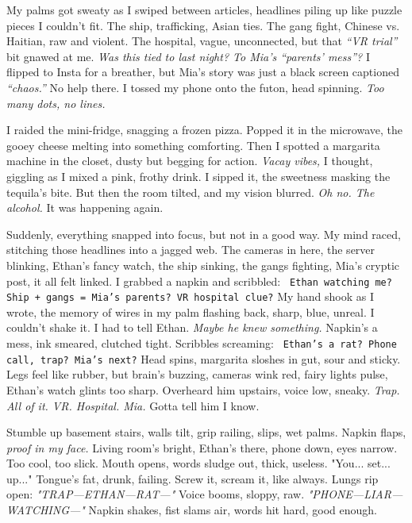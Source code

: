\documentclass[12pt]{article}
\newcommand{\note}[1]{\texttt{\small \color{DarkGray} #1}}
\begin{document}
My palms got sweaty as I swiped between articles, headlines piling up like puzzle pieces I couldn’t fit. The ship, trafficking, Asian ties. The gang fight, Chinese vs. Haitian, raw and violent. The hospital, vague, unconnected, but that \textit{“VR trial”} bit gnawed at me. \textit{Was this tied to last night? To \textnormal{Mia}’s “parents’ mess”?} I flipped to Insta for a breather, but \textnormal{Mia}’s story was just a black screen captioned \textit{“chaos.”} No help there. I tossed my phone onto the futon, head spinning. \textit{Too many dots, no lines.}

I raided the mini-fridge, snagging a frozen pizza. Popped it in the microwave, the gooey cheese melting into something comforting. Then I spotted a margarita machine in the closet, dusty but begging for action. \textit{Vacay vibes,} I thought, giggling as I mixed a pink, frothy drink. I sipped it, the sweetness masking the tequila’s bite. But then the room tilted, and my vision blurred. \textit{Oh no. The alcohol.} It was happening again.

Suddenly, everything snapped into focus, but not in a good way. My mind raced, stitching those headlines into a jagged web. The cameras in here, the server blinking, \textnormal{Ethan}’s fancy watch, the ship sinking, the gangs fighting, \textnormal{Mia}’s cryptic post, it all felt linked. I grabbed a napkin and scribbled: \note{Ethan watching me? Ship + gangs = Mia’s parents? VR hospital clue?} My hand shook as I wrote, the memory of wires in my palm flashing back, sharp, blue, unreal. I couldn’t shake it. I had to tell \textnormal{Ethan}. \textit{Maybe he knew something.} Napkin’s a mess, ink smeared, clutched tight. Scribbles screaming: \note{Ethan’s a rat? Phone call, trap? Mia’s next?} Head spins, margarita sloshes in gut, sour and sticky. Legs feel like rubber, but brain’s buzzing, cameras wink red, fairy lights pulse, \textnormal{Ethan}’s watch glints too sharp. Overheard him upstairs, voice low, sneaky. \textit{Trap. All of it. VR. Hospital. Mia.} Gotta tell him I know.

Stumble up basement stairs, walls tilt, grip railing, slips, wet palms. Napkin flaps, \textit{proof in my face.} Living room’s bright, \textnormal{Ethan}’s there, phone down, eyes narrow. Too cool, too slick. Mouth opens, words sludge out, thick, useless. "You... set... up..." Tongue’s fat, drunk, failing. Screw it, scream it, like always. Lungs rip open: \textit{"TRAP—ETHAN—RAT—"} Voice booms, sloppy, raw. \textit{"PHONE—LIAR—WATCHING—"} Napkin shakes, fist slams air, words hit hard, good enough.
\end{document}
